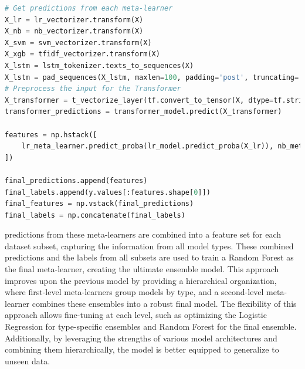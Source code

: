 \begin{tcolorbox}[colback=gray!5!white, colframe=gray!80!black, boxrule=0.5pt, title=Hierarchical Ensemble Model 2] 
    \begin{lstlisting}[language=Python]
# Get predictions from each meta-learner
X_lr = lr_vectorizer.transform(X)
X_nb = nb_vectorizer.transform(X)
X_svm = svm_vectorizer.transform(X)
X_xgb = tfidf_vectorizer.transform(X)
X_lstm = lstm_tokenizer.texts_to_sequences(X)
X_lstm = pad_sequences(X_lstm, maxlen=100, padding='post', truncating='post')
# Preprocess the input for the Transformer
X_transformer = t_vectorize_layer(tf.convert_to_tensor(X, dtype=tf.string))  # Use the text vectorizer layer
transformer_predictions = transformer_model.predict(X_transformer)

features = np.hstack([
    lr_meta_learner.predict_proba(lr_model.predict_proba(X_lr)), nb_meta_learner.predict_proba(nb_model.predict_proba(X_nb)), svm_meta_learner.predict_proba(svm_model.predict_proba(X_svm)), xgb_meta_learner.predict_proba(xgb_model.predict_proba(X_xgb)), lstm_meta_learner.predict_proba(lstm_model.predict(X_lstm)), transformer_meta_learner.predict_proba(transformer_predictions)
])

final_predictions.append(features)
final_labels.append(y.values[:features.shape[0]])
final_features = np.vstack(final_predictions)
final_labels = np.concatenate(final_labels)
    \end{lstlisting}
\end{tcolorbox}

\noindent
predictions from these meta-learners are combined into a feature set for each dataset subset, capturing the information from all model types. These combined predictions and the labels from all subsets are used to train a Random Forest as the final meta-learner, creating the ultimate ensemble model. This approach improves upon the previous model by providing a hierarchical organization, where first-level meta-learners group models by type, and a second-level meta-learner combines these ensembles into a robust final model. The flexibility of this approach allows fine-tuning at each level, such as optimizing the Logistic Regression for type-specific ensembles and Random Forest for the final ensemble. Additionally, by leveraging the strengths of various model architectures and combining them hierarchically, the model is better equipped to generalize to unseen data.

\pagebreak

